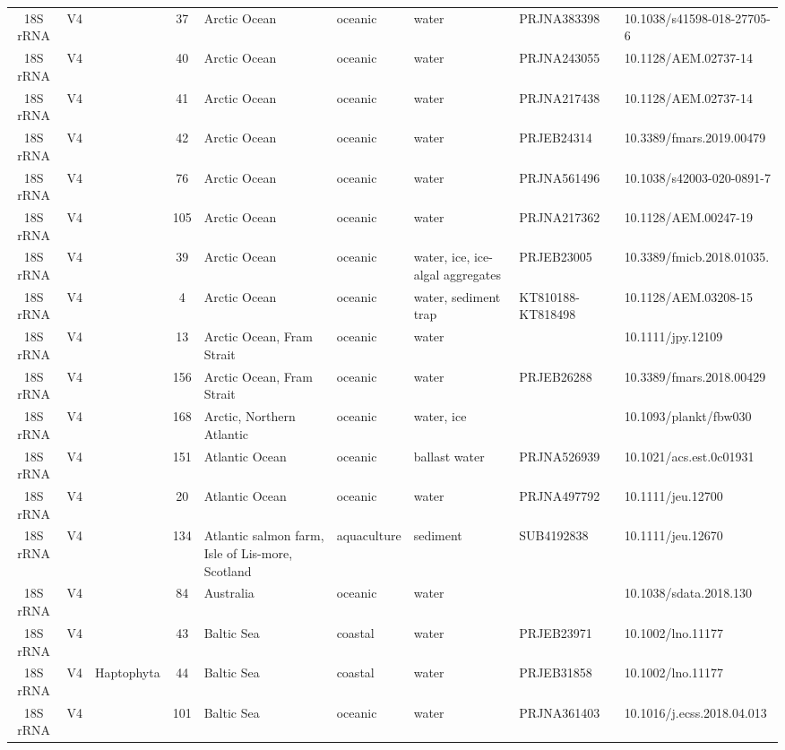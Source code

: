 \begin{longtable}{cccclllll}
  18S rRNA & V4 &  & 37 & Arctic Ocean & oceanic & water & PRJNA383398 & 10.1038/s41598-018-27705-6 \\ 
  18S rRNA & V4 &  & 40 & Arctic Ocean & oceanic & water & PRJNA243055 & 10.1128/AEM.02737-14 \\ 
  18S rRNA & V4 &  & 41 & Arctic Ocean & oceanic & water & PRJNA217438 & 10.1128/AEM.02737-14 \\ 
  18S rRNA & V4 &  & 42 & Arctic Ocean & oceanic & water & 	PRJEB24314 & 10.3389/fmars.2019.00479 \\ 
  18S rRNA & V4 &  & 76 & Arctic Ocean & oceanic & water & PRJNA561496 & 10.1038/s42003-020-0891-7 \\ 
  18S rRNA & V4 &  & 105 & Arctic Ocean & oceanic & water & PRJNA217362 & 10.1128/AEM.00247-19 \\ 
  18S rRNA & V4 &  & 39 & Arctic Ocean & oceanic & water, ice, ice-algal aggregates & PRJEB23005 & 10.3389/fmicb.2018.01035. \\ 
  18S rRNA & V4 &  & 4 & Arctic Ocean & oceanic & water, sediment trap & KT810188-KT818498 & 10.1128/AEM.03208-15 \\ 
  18S rRNA & V4 &  & 13 & Arctic Ocean, Fram Strait & oceanic & water &  & 10.1111/jpy.12109 \\ 
  18S rRNA & V4 &  & 156 & Arctic Ocean, Fram Strait & oceanic & water & PRJEB26288 & 10.3389/fmars.2018.00429 \\ 
  18S rRNA & V4 &  & 168 & Arctic, Northern Atlantic & oceanic & water, ice &  & 10.1093/plankt/fbw030 \\ 
  18S rRNA & V4 &  & 151 & Atlantic Ocean & oceanic & ballast water & PRJNA526939 & 10.1021/acs.est.0c01931 \\ 
  18S rRNA & V4 &  & 20 & Atlantic Ocean & oceanic & water & PRJNA497792 & 10.1111/jeu.12700 \\ 
  18S rRNA & V4 &  & 134 & Atlantic salmon farm, Isle of Lis-more, Scotland & aquaculture & sediment & SUB4192838 & 10.1111/jeu.12670 \\ 
  18S rRNA & V4 &  & 84 & Australia & oceanic & water &  & 10.1038/sdata.2018.130 \\ 
  18S rRNA & V4 &  & 43 & Baltic Sea & coastal & water & PRJEB23971 & 10.1002/lno.11177 \\ 
  18S rRNA & V4 & Haptophyta & 44 & Baltic Sea & coastal & water & PRJEB31858 & 10.1002/lno.11177 \\ 
  18S rRNA & V4 &  & 101 & Baltic Sea & oceanic & water & PRJNA361403 & 10.1016/j.ecss.2018.04.013 \\ 

\end{longtable}
